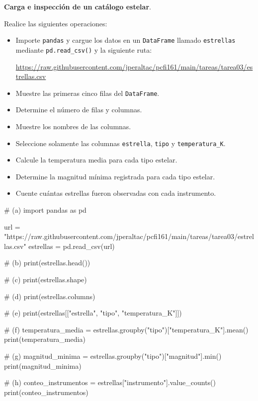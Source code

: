\item \textbf{Carga e inspección de un catálogo estelar}.

\begin{tcolorbox}[colback=blue!2!white,colframe=blue!55!black,title={Enunciado},
                  before skip=3pt,after skip=5pt,boxsep=3pt,top=3pt,bottom=3pt]
\small
\raggedright
Realice las siguientes operaciones:

\begin{itemize}
\setlength{\topsep}{4pt}
\setlength{\itemsep}{3pt}
\setlength{\parsep}{0pt}
\item[(a)] Importe \texttt{pandas} y cargue los datos en un \texttt{DataFrame}
           llamado \texttt{estrellas} mediante \texttt{pd.read\_csv()} y la
           siguiente ruta:
           \begin{center}
           \url{https://raw.githubusercontent.com/jperaltac/pcfi161/main/tareas/tarea03/estrellas.csv}
           \end{center}
\item[(b)] Muestre las primeras cinco filas del \texttt{DataFrame}.
\item[(c)] Determine el número de filas y columnas.
\item[(d)] Muestre los nombres de las columnas.
\item[(e)] Seleccione solamente las columnas \texttt{estrella}, \texttt{tipo} y
           \texttt{temperatura\_K}.
\item[(f)] Calcule la temperatura media para cada tipo estelar.
\item[(g)] Determine la magnitud mínima registrada para cada tipo estelar.
\item[(h)] Cuente cuántas estrellas fueron observadas con cada instrumento.
\end{itemize}
\end{tcolorbox}

\begin{solution}
\begin{pythonjupyter}
# (a)
import pandas as pd

url = "https://raw.githubusercontent.com/jperaltac/pcfi161/main/tareas/tarea03/estrellas.csv"
estrellas = pd.read_csv(url)

# (b)
print(estrellas.head())

# (c)
print(estrellas.shape)

# (d)
print(estrellas.columns)

# (e)
print(estrellas[["estrella", "tipo", "temperatura_K"]])

# (f)
temperatura_media = estrellas.groupby("tipo")["temperatura_K"].mean()
print(temperatura_media)

# (g)
magnitud_minima = estrellas.groupby("tipo")["magnitud"].min()
print(magnitud_minima)

# (h)
conteo_instrumentos = estrellas["instrumento"].value_counts()
print(conteo_instrumentos)
\end{pythonjupyter}
\end{solution}
